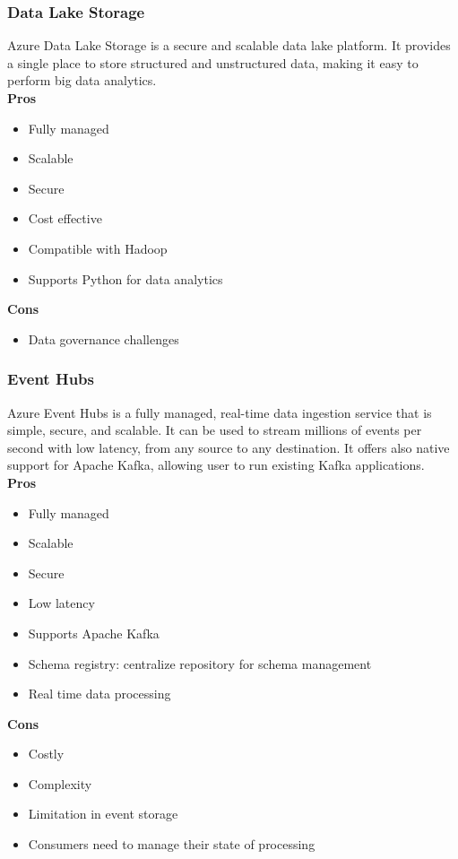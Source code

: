         \subsubsection{Data Lake Storage}
        \label{azure:data-lake-storage}
        Azure Data Lake Storage is a secure and scalable data lake platform. It provides a single place to store structured and unstructured data, making it easy to perform big data analytics.\\
        \textbf{Pros}
        \begin{itemize}
            \item Fully managed
            \item Scalable
            \item Secure
            \item Cost effective
            \item Compatible with Hadoop
            \item Supports Python for data analytics
        \end{itemize}
        \textbf{Cons}
        \begin{itemize}
            \item Data governance challenges
        \end{itemize}

        \subsubsection{Event Hubs}
        \label{azure:event-hubs}
        Azure Event Hubs is a fully managed, real-time data ingestion service that is simple, secure, and scalable. It can be used to stream millions of events per second with low latency, from any source to any destination.
         It offers also native support for Apache Kafka, allowing user to run existing Kafka applications.\\
        \textbf{Pros}
        \begin{itemize}
            \item Fully managed
            \item Scalable
            \item Secure
            \item Low latency
            \item Supports Apache Kafka
            \item Schema registry: centralize repository for schema management
            \item Real time data processing
        \end{itemize}
        \textbf{Cons}
        \begin{itemize}
            \item Costly
            \item Complexity
            \item Limitation in event storage
            \item Consumers need to manage their state of processing
        \end{itemize}

